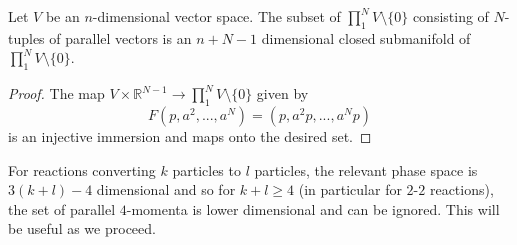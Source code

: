 \begin{lemma}\label{parallel_lemma}
Let $V$ be an $n$-dimensional vector space.  The subset of $\prod_1^N V\setminus\{0\}$ consisting of $N$-tuples of parallel vectors is an $n+N-1$ dimensional closed submanifold of $\prod_1^N V\setminus\{0\}$.
\end{lemma}
\begin{proof}
The map $V\times \mathbb{R}^{N-1}\rightarrow  \prod_1^N V\setminus\{0\}$ given by
\begin{equation}
F(p,a^2,...,a^N)=(p,a^2p,...,a^{N}p)
\end{equation}
is an injective immersion and maps onto the desired set.
\end{proof}
For reactions converting $k$ particles to $l$ particles, the relevant phase space is $3(k+l)-4$ dimensional and so for $k+l\geq 4$ (in particular for $2$-$2$ reactions), the set of parallel $4$-momenta is lower dimensional and can be ignored. This will be useful as we proceed.

